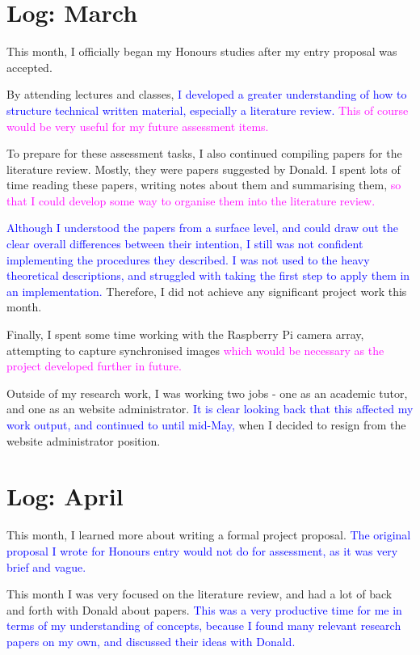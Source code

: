 \documentclass[a4paper, 12pt]{article}
\begin{document}
\newpage
\section{Log: March}
This month, I officially began my Honours studies after my entry proposal was accepted.

By attending lectures and classes, \textcolor{Blue}{I developed a greater understanding of how to structure technical written material, especially a literature review.} \textcolor{Magenta}{This of course would be very useful for my future assessment items.}

To prepare for these assessment tasks, I also continued compiling papers for the literature review. Mostly, they were papers suggested by Donald. I spent lots of time reading these papers, writing notes about them and summarising them, \textcolor{Magenta}{so that I could develop some way to organise them into the literature review.}

\textcolor{Blue}{Although I understood the papers from a surface level, and could draw out the clear overall differences between their intention, I still was not confident implementing the procedures they described. I was not used to the heavy theoretical descriptions, and struggled with taking the first step to apply them in an implementation.} Therefore, I did not achieve any significant project work this month.

Finally, I spent some time working with the Raspberry Pi camera array, attempting to capture synchronised images \textcolor{Magenta}{which would be necessary as the project developed further in future.}

Outside of my research work, I was working two jobs - one as an academic tutor, and one as an website administrator. \textcolor{Blue}{It is clear looking back that this affected my work output, and continued to until mid-May,} when I decided to resign from the website administrator position.

\newpage
\section{Log: April}
This month, I learned more about writing a formal project proposal. \textcolor{Blue}{The original proposal I wrote for Honours entry would not do for assessment, as it was very brief and vague.}

This month I was very focused on the literature review, and had a lot of back and forth with Donald about papers. \textcolor{Blue}{This was a very productive time for me in terms of my understanding of concepts, because I found many relevant research papers on my own, and discussed their ideas with Donald.}
\end{document}
